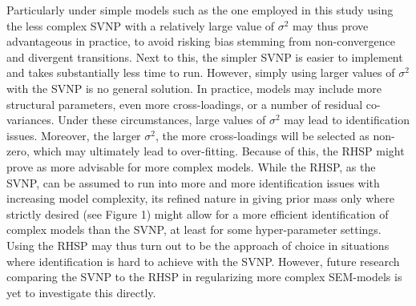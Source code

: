 \documentclass[]{interact}
\theoremstyle{plain}%
\theoremstyle{definition}
\theoremstyle{remark}
\begin{document}
Particularly under simple models such as the one employed in this study
using the less complex SVNP with a relatively large value of
\(\sigma^2\) may thus prove advantageous in practice, to avoid risking
bias stemming from non-convergence and divergent transitions. Next to
this, the simpler SVNP is easier to implement and takes substantially
less time to run. However, simply using larger values of \(\sigma^2\)
with the SVNP is no general solution. In practice, models may include
more structural parameters, even more cross-loadings, or a number of
residual co-variances. Under these circumstances, large values of
\(\sigma^2\) may lead to identification issues. Moreover, the larger
\(\sigma^2\), the more cross-loadings will be selected as non-zero,
which may ultimately lead to over-fitting. Because of this, the RHSP
might prove as more advisable for more complex models. While the RHSP,
as the SVNP, can be assumed to run into more and more identification
issues with increasing model complexity, its refined nature in giving
prior mass only where strictly desired (see Figure 1) might allow for a
more efficient identification of complex models than the SVNP, at least
for some hyper-parameter settings. Using the RHSP may thus turn out to
be the approach of choice in situations where identification is hard to
achieve with the SVNP. However, future research comparing the SVNP to
the RHSP in regularizing more complex SEM-models is yet to investigate
this directly.
\end{document}
